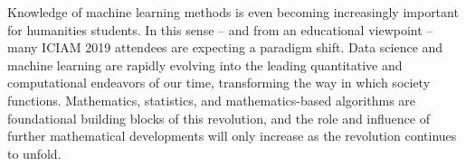 Knowledge of machine learning methods is even becoming increasingly important for humanities students. In this sense -- and from an educational viewpoint -- many ICIAM 2019 attendees are expecting a paradigm shift. Data science and machine learning are rapidly evolving into the leading quantitative and computational endeavors of our time, transforming the way in which society functions. Mathematics, statistics, and mathematics-based algorithms are foundational building blocks of this revolution, and the role and influence of further mathematical developments will only increase as the revolution continues to unfold.

